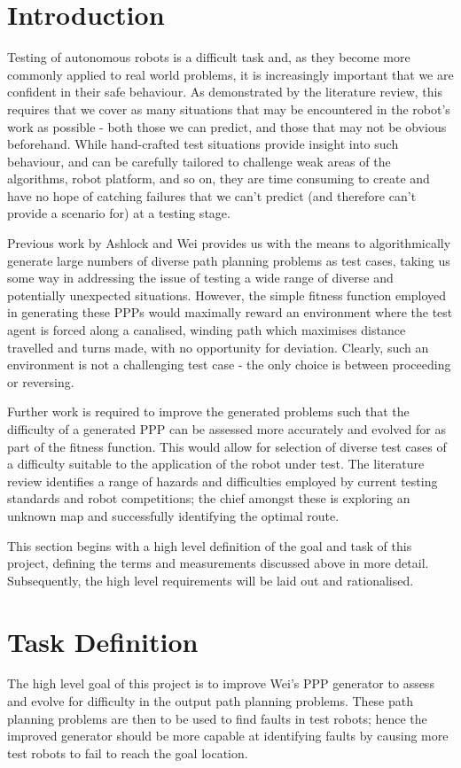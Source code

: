 \documentclass[authoryearcitations]{UoYCSproject}
\begin{document}
\section{Introduction}
\label{sec:pa1}
Testing of autonomous robots is a difficult task and, as they become more commonly applied to real world problems, it is increasingly important that we are confident in their safe behaviour. As demonstrated by the literature review, this requires that we cover as many situations that may be encountered in the robot's work as possible - both those we can predict, and those that may not be obvious beforehand. While hand-crafted test situations provide insight into such behaviour, and can be carefully tailored to challenge weak areas of the algorithms, robot platform, and so on, they are time consuming to create and have no hope of catching failures that we can't predict (and therefore can't provide a scenario for) at a testing stage.

Previous work by Ashlock and Wei provides us with the means to algorithmically generate large numbers of diverse path planning problems as test cases, taking us some way in addressing the issue of testing a wide range of diverse and potentially unexpected situations. However, the simple fitness function employed in generating these PPPs would maximally reward an environment where the test agent is forced along a canalised, winding path which maximises distance travelled and turns made, with no opportunity for deviation. Clearly, such an environment is not a challenging test case - the only choice is between proceeding or reversing.

Further work is required to improve the generated problems such that the difficulty of a generated PPP can be assessed more accurately and evolved for as part of the fitness function. This would allow for selection of diverse test cases of a difficulty suitable to the application of the robot under test. The literature review identifies a range of hazards and difficulties employed by current testing standards and robot competitions; the chief amongst these is exploring an unknown map and successfully identifying the optimal route.

This section begins with a high level definition of the goal and task of this project, defining the terms and measurements discussed above in more detail. Subsequently, the high level requirements will be laid out and rationalised.

\section{Task Definition}
\label{sec:pa2}
The high level goal of this project is to improve Wei's PPP generator to assess and evolve for difficulty in the output path planning problems. These path planning problems are then to be used to find faults in test robots; hence the improved generator should be more capable at identifying faults by causing more test robots to fail to reach the goal location.
\end{document}
